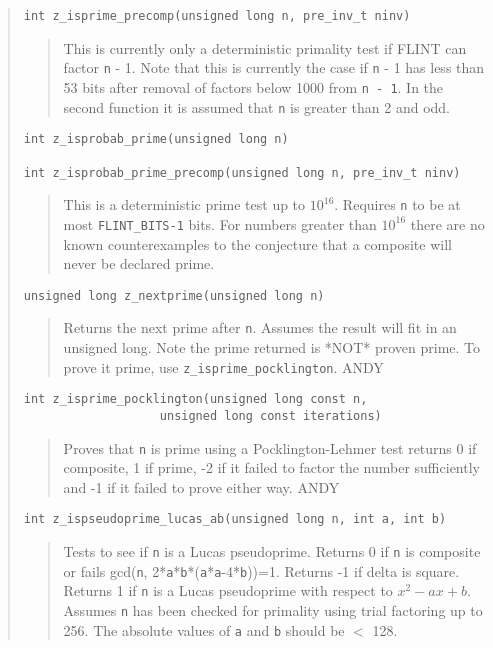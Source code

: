 \documentclass[a4paper,10pt]{article}
\newcommand{\code}{\lstinline}
\begin{document}
\begin{quote}
\begin{lstlisting}
int z_isprime_precomp(unsigned long n, pre_inv_t ninv)
\end{lstlisting}
\begin{quote}
This is currently only a deterministic primality test if FLINT can factor \code{n} - 1.  Note that this is currently the case if \code{n} - 1 has less than 53 bits after removal of factors below 1000 from \code{n - 1}.  In the second function it is assumed that \code{n} is greater than 2 and odd. 
\end{quote}

\begin{lstlisting}
int z_isprobab_prime(unsigned long n)

int z_isprobab_prime_precomp(unsigned long n, pre_inv_t ninv)
\end{lstlisting}
\begin{quote}
This is a deterministic prime test up to $10^16$. Requires \code{n} to be at most \code{FLINT_BITS-1} bits.  For numbers greater than $10^16$ there are no known counterexamples to the conjecture that a composite will never be declared prime. 
\end{quote}

\begin{lstlisting}
unsigned long z_nextprime(unsigned long n)
\end{lstlisting}
\begin{quote}
Returns the next prime after \code{n}.  Assumes the result will fit in an unsigned long.  Note the prime returned is *NOT* proven prime.  To prove it prime, use \code{z_isprime_pocklington}.  ANDY
\end{quote}

\begin{lstlisting}
int z_isprime_pocklington(unsigned long const n,
                   unsigned long const iterations)
\end{lstlisting}
\begin{quote}
Proves that \code{n} is prime using a Pocklington-Lehmer test returns 0 if composite, 1 if prime, -2 if it failed to factor the number sufficiently and -1 if it failed to prove either way.  ANDY
\end{quote}

\begin{lstlisting}
int z_ispseudoprime_lucas_ab(unsigned long n, int a, int b)
\end{lstlisting}
\begin{quote}
Tests to see if \code{n} is a Lucas pseudoprime.  Returns 0 if \code{n} is composite or fails gcd(\code{n}, 2*\code{a}*\code{b}*(\code{a}*\code{a}-4*\code{b}))=1.  Returns -1 if delta is square.  Returns 1 if \code{n} is a Lucas pseudoprime with respect to $x^2-ax+b$.  Assumes \code{n} has been checked for primality using trial factoring up to 256.  The absolute values of \code{a} and \code{b} should be $<$ 128. 
\end{quote}


\end{quote}
\end{document}

